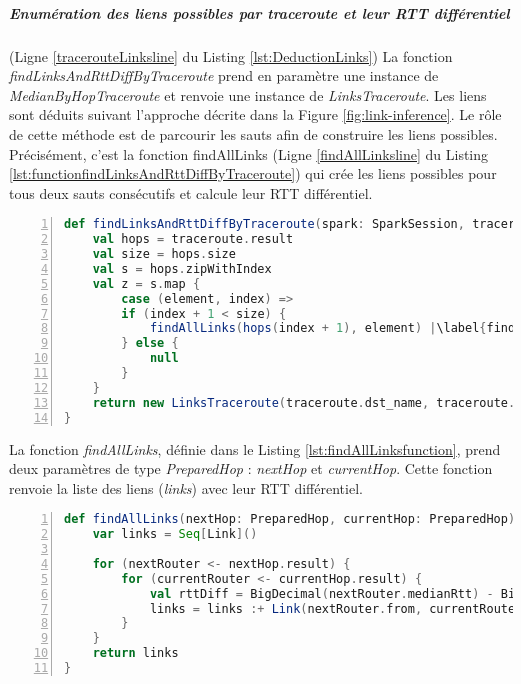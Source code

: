 \subparagraph{Enumération des liens possibles par traceroute et leur RTT différentiel} (Ligne \ref{tracerouteLinksline} du Listing \ref{lst:DeductionLinks})  La fonction \textit{findLinksAndRttDiffByTraceroute} prend en paramètre une instance de \textit{MedianByHopTraceroute} et renvoie une instance de \textit{LinksTraceroute}. Les liens sont déduits suivant l'approche décrite dans la Figure \ref{fig:link-inference}. Le rôle de cette méthode est de parcourir les sauts afin de construire les liens possibles. Précisément, c'est la fonction findAllLinks (Ligne \ref{findAllLinksline} du Listing \ref{lst:functionfindLinksAndRttDiffByTraceroute}) qui crée les liens possibles pour tous deux sauts consécutifs et calcule leur RTT différentiel.

\begin{lstlisting}[language=scala,firstnumber=1, caption={Définition de la fonction findLinksAndRttDiffByTraceroute},label={lst:functionfindLinksAndRttDiffByTraceroute}, basicstyle = \footnotesize,escapechar=|,numbers=left,
stepnumber=1] 
  def findLinksAndRttDiffByTraceroute(spark: SparkSession, traceroute: MedianByHopTraceroute): LinksTraceroute = {
	val hops = traceroute.result
	val size = hops.size
	val s = hops.zipWithIndex
	val z = s.map {
		case (element, index) =>
		if (index + 1 < size) {
			findAllLinks(hops(index + 1), element) |\label{findAllLinksline}|
		} else {
			null
		}
	}
	return new LinksTraceroute(traceroute.dst_name, traceroute.from, traceroute.prb_id, traceroute.msm_id, traceroute.timestamp, z.filter(p => p != null).flatten)
}
\end{lstlisting}

 La fonction \textit{findAllLinks}, définie dans le Listing \ref{lst:findAllLinksfunction}, prend deux paramètres de type \textit{PreparedHop} : \textit{nextHop} et \textit{currentHop}. Cette fonction renvoie la liste des liens (\textit{links}) avec leur RTT différentiel. 
 
 \begin{lstlisting}[language=scala,firstnumber=1, caption={Définition de la fonction findAllLinks},label={lst:findAllLinksfunction}, basicstyle = \footnotesize,escapechar=|,numbers=left,
 stepnumber=1] 
  def findAllLinks(nextHop: PreparedHop, currentHop: PreparedHop): Seq[Link] = {
	var links = Seq[Link]()
	
	for (nextRouter <- nextHop.result) {
		for (currentRouter <- currentHop.result) {
			val rttDiff = BigDecimal(nextRouter.medianRtt) - BigDecimal(currentRouter.medianRtt)
			links = links :+ Link(nextRouter.from, currentRouter.from, rttDiff.toDouble)
		}
	}
	return links
}
\end{lstlisting}

